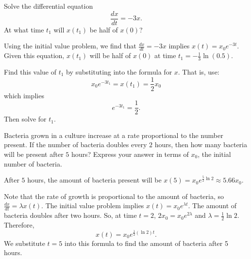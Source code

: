 \documentclass{ximera}
\begin{document}
\begin{exercise} \label{c3.1.2}
Solve the differential equation
\[
\frac{dx}{dt} = -3x.
\]
At what time $t_1$ will $x(t_1)$ be half of $x(0)$?

\begin{solution}

\ans Using the initial value problem, we find that $\frac{dx}{dt} = -3x$
implies $x(t) = x_0e^{-3t}$.  Given this equation, $x(t_1)$ will be half
of $x(0)$ at time $t_1 = -\frac{1}{3} \ln(0.5)$.

\soln Find this value of $t_1$ by substituting into the formula for $x$. 
That is, use:
\[
x_0e^{-3t_1} = x(t_1) = \frac{1}{2}x_0
\]
which implies
\[ e^{-3t_1} = \frac{1}{2}. \]
Then solve for $t_1$.

\end{solution}
\end{exercise}

\begin{exercise} \label{c3.1.3}
Bacteria grown in a culture increase at a rate proportional to the
number present.  If the number of bacteria doubles every $2$ hours,
then how many bacteria will be pre\-sent af\-ter $5$ hours?  Express
your answer in terms of $x_0$, the initial number of bacteria.

\begin{solution}

\ans After $5$ hours, the amount of bacteria present will be
$x(5) = x_0e^{\frac{5}{2} \ln 2} \approx 5.66x_0$.

\soln Note that the rate of growth is proportional to the amount of
bacteria, so $\frac{dx}{dt} = \lambda x(t)$.  The initial value problem
implies $x(t) = x_0e^{\lambda t}$.  The amount of bacteria doubles after
two hours.  So, at time $t = 2$, $2x_0 = x_0e^{2\lambda}$ and
$\lambda = \frac{1}{2} \ln 2$.  Therefore,
\[ x(t) = x_0e^{\frac{1}{2} (\ln 2)t}. \]
We substitute $t = 5$ into this formula to find the amount of
bacteria after 5 hours.

\end{solution}
\end{exercise}
\end{document}
